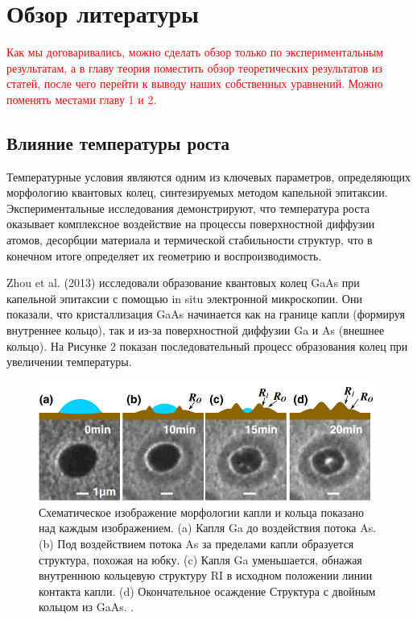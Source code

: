 \documentclass[14pt,oneside]{extarticle}
\begin{document}
\pagebreak
\section{Обзор литературы}

\textcolor{red}{Как мы договаривались, можно сделать обзор только по экспериментальным результатам, а в главу теория поместить обзор теоретических результатов из статей, после чего перейти к выводу наших собственных уравнений. Можно поменять местами главу 1 и 2.}

\subsection{Влияние температуры роста}

Температурные условия являются одним из ключевых параметров, определяющих морфологию квантовых колец, синтезируемых методом капельной эпитаксии. Экспериментальные исследования демонстрируют, что температура роста оказывает комплексное воздействие на процессы поверхностной диффузии атомов, десорбции материала и термической стабильности структур, что в конечном итоге определяет их геометрию и воспроизводимость.

Zhou et al. (2013) исследовали образование квантовых колец GaAs при капельной эпитаксии с помощью in situ электронной микроскопии. Они показали, что кристаллизация GaAs начинается как на границе капли (формируя внутреннее кольцо), так и из-за поверхностной диффузии Ga и As (внешнее кольцо). На Рисунке 2 показан последовательный процесс образования колец при увеличении температуры.

\begin{figure}
\begin{center}
        \includegraphics[width=11cm]{images/Zhou1-Firgure1.png}
        \caption{\label{fig:Zhou1-1}
            Схематическое изображение морфологии капли и кольца показано над каждым изображением. (a) Капля Ga до воздействия потока As. (b) Под воздействием потока As за пределами капли образуется структура, похожая на юбку. (c) Капля Ga уменьшается, обнажая внутреннюю кольцевую структуру RI в исходном положении линии контакта капли. (d) Окончательное осаждение Структура с двойным кольцом из GaAs. \cite{Zhou1}.}
\end{center}
\end{figure}
\end{document}
